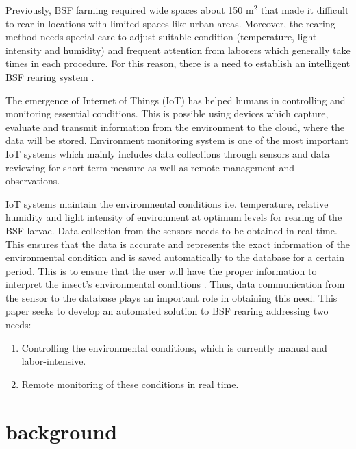 \documentclass[conference]{IEEEtran}
\begin{document}
Previously, BSF farming required wide spaces about 150 m$^2$ that made it difficult to rear in locations with limited spaces like urban areas. Moreover, the rearing method needs special care to adjust suitable condition (temperature, light intensity and humidity) and frequent attention from laborers which generally take times in each procedure.  For this reason, there is a need to establish an intelligent BSF rearing system \cite{lamport94}.

The emergence of Internet of Things (IoT) has helped humans in controlling and monitoring essential conditions. This is possible using devices which capture, evaluate and transmit information from the environment to the cloud, where the data will be stored. Environment monitoring system is one of the most important IoT systems which mainly includes data collections through sensors and data reviewing for short-term measure as well as remote management and observations.

IoT systems maintain the environmental conditions i.e. temperature, relative humidity and light intensity of environment at optimum levels for rearing of the BSF larvae. Data collection from the sensors needs to be obtained in real time. This ensures that the data is accurate and represents the exact information of the environmental condition and is saved automatically to the database for a certain period. This is to ensure that the user will have the proper information to interpret the insect’s environmental conditions \cite{b2}. Thus, data communication from the sensor to the database plays an important role in obtaining this need. 
This paper seeks to develop an automated solution to BSF rearing addressing two needs:
\begin{enumerate}
\item Controlling the environmental conditions, which is currently manual and labor-intensive. 
\item Remote monitoring of these conditions in real time.
\end{enumerate}





\section{background}
\end{document}
